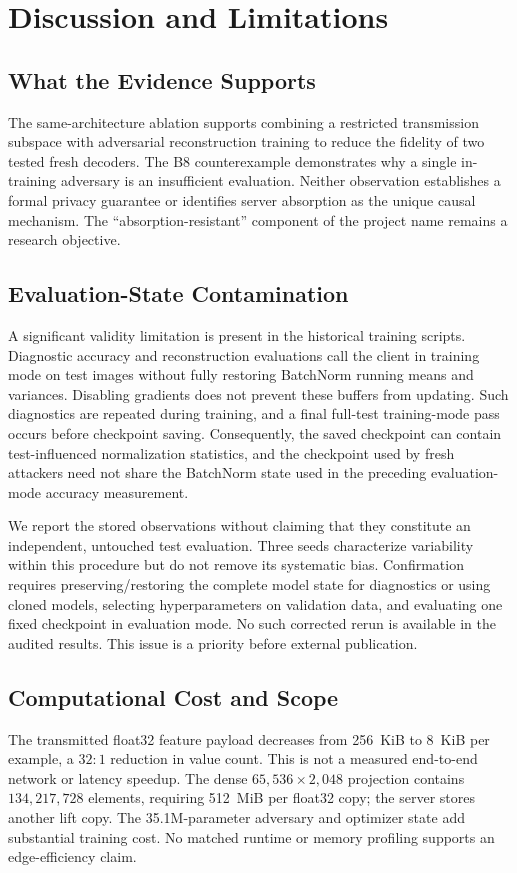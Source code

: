 \section{Discussion and Limitations}
\label{sec:limitations}
\subsection{What the Evidence Supports}
The same-architecture ablation supports combining a restricted transmission subspace with adversarial reconstruction training to reduce the fidelity of two tested fresh decoders. The B8 counterexample demonstrates why a single in-training adversary is an insufficient evaluation. Neither observation establishes a formal privacy guarantee or identifies server absorption as the unique causal mechanism. The ``absorption-resistant'' component of the project name remains a research objective.

\subsection{Evaluation-State Contamination}
A significant validity limitation is present in the historical training scripts. Diagnostic accuracy and reconstruction evaluations call the client in training mode on test images without fully restoring BatchNorm running means and variances. Disabling gradients does not prevent these buffers from updating. Such diagnostics are repeated during training, and a final full-test training-mode pass occurs before checkpoint saving. Consequently, the saved checkpoint can contain test-influenced normalization statistics, and the checkpoint used by fresh attackers need not share the BatchNorm state used in the preceding evaluation-mode accuracy measurement.

We report the stored observations without claiming that they constitute an independent, untouched test evaluation. Three seeds characterize variability within this procedure but do not remove its systematic bias. Confirmation requires preserving/restoring the complete model state for diagnostics or using cloned models, selecting hyperparameters on validation data, and evaluating one fixed checkpoint in evaluation mode. No such corrected rerun is available in the audited results. This issue is a priority before external publication.

\subsection{Computational Cost and Scope}
The transmitted float32 feature payload decreases from 256~KiB to 8~KiB per example, a $32{:}1$ reduction in value count. This is not a measured end-to-end network or latency speedup. The dense $65{,}536\times2{,}048$ projection contains $134{,}217{,}728$ elements, requiring 512~MiB per float32 copy; the server stores another lift copy. The 35.1M-parameter adversary and optimizer state add substantial training cost. No matched runtime or memory profiling supports an edge-efficiency claim.

